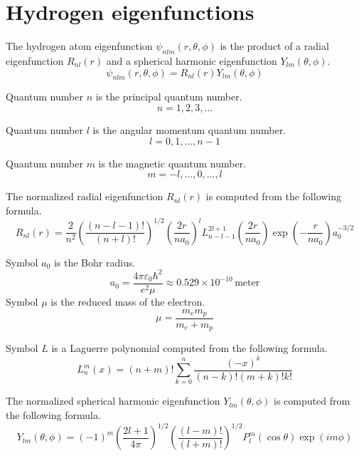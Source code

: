 

\section*{Hydrogen eigenfunctions}

The hydrogen atom eigenfunction $\psi_{nlm}(r,\theta,\phi)$
is the product of a radial eigenfunction $R_{nl}(r)$ and a spherical
harmonic eigenfunction $Y_{lm}(\theta,\phi)$.
\begin{equation*}
\psi_{nlm}(r,\theta,\phi)=R_{nl}(r)Y_{lm}(\theta,\phi)
\end{equation*}

Quantum number $n$ is the principal quantum number.
\begin{equation*}
n=1,2,3,\ldots
\end{equation*}

Quantum number $l$ is the angular momentum quantum number.
\begin{equation*}
l=0,1,\ldots,n-1
\end{equation*}

Quantum number $m$ is the magnetic quantum number.
\begin{equation*}
m=-l,\ldots,0,\ldots,l
\end{equation*}

The normalized radial eigenfunction $R_{nl}(r)$ is computed from the following formula.
\begin{equation*}
R_{nl}(r)=
\frac{2}{n^2}
\left(\frac{(n-l-1)!}{(n+l)!}\right)^{1/2}
\left(\frac{2r}{na_0}\right)^l
L_{n-l-1}^{2l+1}\left(\frac{2r}{na_0}\right)
\exp\left(-\frac{r}{na_0}\right)
a_0^{-3/2}
\end{equation*}

Symbol $a_0$ is the Bohr radius.
\begin{equation*}
a_0=\frac{4\pi\varepsilon_0\hbar^2}{e^2\mu}
\approx0.529\times10^{-10}\,\text{meter}
\end{equation*}
Symbol $\mu$ is the reduced mass of the electron.
\begin{equation*}
\mu=\frac{m_e m_p}{m_e+m_p}
\end{equation*}

Symbol $L$ is a Laguerre polynomial computed from the following formula.
\begin{equation*}
L_n^m(x)=(n+m)!\sum_{k=0}^n
\frac{(-x)^k}{(n-k)!(m+k)!k!}
\end{equation*}

The normalized spherical harmonic eigenfunction $Y_{lm}(\theta,\phi)$
is computed from the following formula.
\begin{equation*}
Y_{lm}(\theta,\phi)=(-1)^m
\left(\frac{2l+1}{4\pi}\right)^{1/2}
\left(\frac{(l-m)!}{(l+m)!}\right)^{1/2}
P_l^m(\cos\theta)\exp(im\phi)
\end{equation*}

